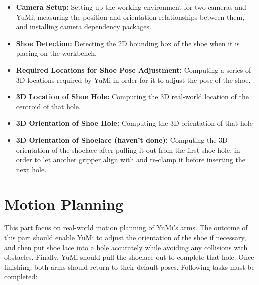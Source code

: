 \begin{itemize}
    \item \textbf{Camera Setup:} Setting up the working environment for two cameras and YuMi, measuring the position and orientation relationships between them, and installing camera dependency packages.
    \item \textbf{Shoe Detection:} Detecting the 2D bounding box of the shoe when it is placing on the workbench.
    \item \textbf{Required Locations for Shoe Pose Adjustment:} Computing a series of 3D locations required by YuMi in order for it to adjust the pose of the shoe.
    \item \textbf{3D Location of Shoe Hole:} Computing the 3D real-world location of the centroid of that hole.
    \item \textbf{3D Orientation of Shoe Hole:} Computing the 3D orientation of that hole
    \item \textbf{3D Orientation of Shoelace (haven't done):} Computing the 3D orientation of the shoelace after pulling it out from the first shoe hole, in order to let another gripper align with and re-clamp it before inserting the next hole.
\end{itemize}


\section{Motion Planning}
This part focus on real-world motion planning of YuMi's arms. The outcome of this part should enable YuMi to adjust the orientation of the shoe if necessary, and then put shoe lace into a hole accurately while avoiding any collisions with obstacles. Finally, YuMi should pull the shoelace out to complete that hole. Once finishing, both arms should return to their default poses. Following tasks must be completed:

